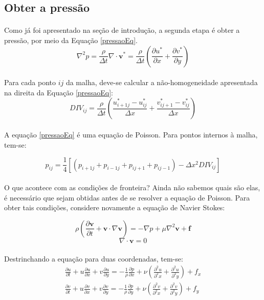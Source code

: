 \documentclass[poisson.tex]{subfiles}
\begin{document}
\subsection{Obter a pressão}
\paragraph{} Como já foi apresentado na seção de introdução, a segunda etapa é obter a pressão, por meio da Equação \ref{pressaoEq}.
\begin{equation}
\nabla^2 p = \frac{\rho}{\Delta t} \nabla\cdot \textbf{v}^*=\frac{\rho}{\Delta t} 
\left( \frac{\partial u^*}{\partial x}+\frac{\partial v^*}{\partial y} \right) \label{pressaoEq}
\end{equation}
\paragraph{} Para cada ponto $ij$ da malha, deve-se calcular a não-homogeneidade apresentada na direita da Equação \ref{pressaoEq}:
\begin{equation}
DIV_{ij}=\frac{\rho}{\Delta t}\left( \frac{u_{i+1j}^*-u_{ij}^*}{\Delta x}+\frac{v_{ij+1}^*-v_{ij}^*}{\Delta x}\right)
\end{equation}
\paragraph{} A equação \ref{pressaoEq} é uma equação de Poisson. Para pontos internos à malha, tem-se:

\begin{equation}
p_{ij}=\frac{1}{4}[(p_{i+1j}+p_{i-1j}+p_{ij+1}+p_{ij-1})-\Delta x^2 DIV_{ij}]
\end{equation}

\paragraph{} O que acontece com as condições de fronteira? Ainda não sabemos quais são elas, é necessário que sejam obtidas antes de se resolver a equação de Poisson. Para obter tais condições, considere novamente a equação de Navier Stokes:

\[\rho\left( \frac{\partial \textbf{v}}{\partial t}+\textbf{v}\cdot\nabla\textbf{v}\right)=-\nabla p+\mu\nabla^2\textbf{v}+\textbf{f}\]
\[\nabla\cdot\textbf{v}=0\]
\paragraph{} Destrinchando a equação para duas coordenadas, tem-se:
\begin{eqnarray}
\frac{\partial u}{\partial t}+u\frac{\partial u}{\partial x}+v\frac{\partial
u}{\partial y}=-\frac{1}{\rho}\frac{\partial p}{\partial
x}+\nu\left(\frac{\partial^2 u}{\partial^2 x}+\frac{\partial^2 u}{\partial^2
y}\right)+f_x\\
\frac{\partial v}{\partial t}+u\frac{\partial v}{\partial x}+v\frac{\partial
v}{\partial y}=-\frac{1}{\rho}\frac{\partial p}{\partial
y}+\nu\left(\frac{\partial^2 v}{\partial^2 x}+\frac{\partial^2 v}{\partial^2
y}\right)+f_y
\end{eqnarray}
\end{document}
